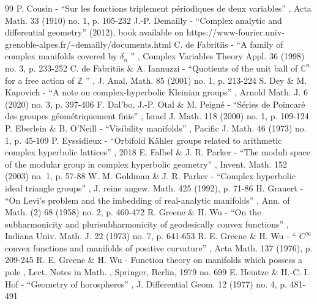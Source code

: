 \documentclass[11pt]{article}
\theoremstyle{definition}
\begin{document}
\begin{thebibliography}{99}
 P. Cousin - “Sur les fonctions triplement périodiques de deux variables” , Acta Math. 33 (1910) no. 1, p. 105-232
 J.-P. Demailly - “Complex analytic and differential geometry” (2012), book available on https://www-fourier.univ-grenoble-alpes.fr/\textasciitilde{}demailly/documents.html
 C. de Fabritiis - “A family of complex manifolds covered by $\delta _n$ ” , Complex Variables Theory Appl. 36 (1998) no. 3, p. 233-252
 C. de Fabritiis \& A. Iannuzzi - “Quotients of the unit ball of $\mathbb{C}^{n}$ for a free action of $\mathbb{Z}$ ” , J. Anal. Math. 85 (2001) no. 1, p. 213-224
 S. Dey \& M. Kapovich - “A note on complex-hyperbolic Kleinian groups” , Arnold Math. J. 6 (2020) no. 3, p. 397-406
 F. Dal’bo, J.-P. Otal \& M. Peigné - “Séries de Poincaré des groupes géométriquement finis” , Israel J. Math. 118 (2000) no. 1, p. 109-124
 P. Eberlein \& B. O’Neill - “Visibility manifolds” , Pacific J. Math. 46 (1973) no. 1, p. 45-109
 P. Eyssidieux - “Orbifold Kähler groups related to arithmetic complex hyperbolic lattices” , 2018
 E. Falbel \& J. R. Parker - “The moduli space of the modular group in complex hyperbolic geometry” , Invent. Math. 152 (2003) no. 1, p. 57-88
 W. M. Goldman \& J. R. Parker - “Complex hyperbolic ideal triangle groups” , J. reine angew. Math. 425 (1992), p. 71-86
 H. Grauert - “On Levi’s problem and the imbedding of real-analytic manifolds” , Ann. of Math. (2) 68 (1958) no. 2, p. 460-472
 R. Greene \& H. Wu - “On the subharmonicity and plurisubharmonicity of geodesically convex functions” , Indiana Univ. Math. J. 22 (1973) no. 7, p. 641-653
 R. E. Greene \& H. Wu - “ $C^\infty $ convex functions and manifolds of positive curvature” , Acta Math. 137 (1976), p. 209-245
 R. E. Greene \& H. Wu - Function theory on manifolds which possess a pole , Lect. Notes in Math. , Springer, Berlin, 1979 no. 699
 E. Heintze \& H.-C. I. Hof - “Geometry of horospheres” , J. Differential Geom. 12 (1977) no. 4, p. 481-491

\end{thebibliography}
\end{document}
